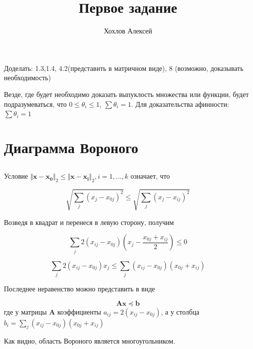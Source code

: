
\title{Первое задание}
\author{
	Хохлов Алексей \\
}


	\maketitle
	
	Доделать: 1.3,1.4, 4.2(представить в матричном виде), 8 (возможно, доказывать необходимость)
	
	Везде, где будет необходимо доказать выпуклость множества или функции, будет
	подразумеваться, что $0 \leqslant \theta_i \leqslant 1$, $\sum \theta_i = 1$.
	Для доказательства афинности:$\sum \theta_i = 1$
	
	\section{Диаграмма Вороного}
	
	\subsection{}
	
	Условие $\Vert \mathbf{x} - \mathbf{x_0} \Vert_2 \leqslant \Vert \mathbf{x} -
	\mathbf{x_i} \Vert_2 , i=1,...,k$ означает, что
	
	\begin{equation}
	\sqrt {\sum_j (x_j-x_{0j})^2 }\leqslant \sqrt {\sum_j (x_j-x_{ij})^2 }
	\end{equation}
	
	Возведя в квадрат и перенеся в левую сторону, получим
	
	\begin{equation}
	\sum_j 2(x_{ij}-x_{0j})(x_j - \frac{x_{0j}+x_{ij}}{2}) \leqslant 0
	\end{equation}
	
	\begin{equation}
	\label{13}
	\sum_j 2(x_{ij}-x_{0j})x_j \leqslant  	\sum_j (x_{ij}-x_{0j}) (x_{0j}+x_{ij}) 
	\end{equation}
	
	Последнее неравенство можно представить в виде
	
	\begin{equation}
	\mathbf{A} \mathbf{x} \preceq \mathbf{b}
	\end{equation}
	где у матрицы $\mathbf{A}$ коэффициенты $ a_{ij} = 2(x_{ij}-x_{0j})$, а у
	столбца $ b_i = \sum\limits_{j} (x_{ij}-x_{0j}) (x_{0j}+x_{ij}) $
	
	Как видно, область Вороного является многоугольником.
	
